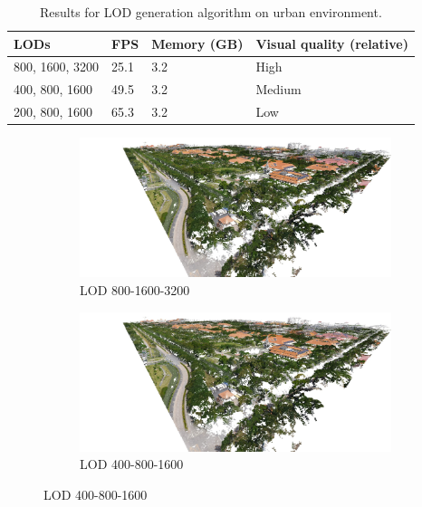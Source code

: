 \begin{table}[h]
    \centering
    \begin{tabular}{l|l|l|l}
    LODs & FPS & Memory (GB) & Visual quality (relative) \\ \hline
    800, 1600, 3200 & 25.1 & 3.2 & High \\
    400, 800, 1600 & 49.5 & 3.2 & Medium \\
    200, 800, 1600 & 65.3 & 3.2 & Low
    \end{tabular}
    
    \caption{Results for LOD generation algorithm on urban environment.}
    \label{tab:results:lod-urban}
\end{table}

\begin{figure}[htb]
    \centering
    
    \begin{subfigure}{0.45\textwidth}
        \centering
        \includegraphics[width=\textwidth]{lod-urban-800.jpg}
        \caption{LOD 800-1600-3200}
        \label{fig:results:lod-urban-800}
    \end{subfigure}
    \begin{subfigure}{0.45\textwidth}
        \centering
        \includegraphics[width=\textwidth]{lod-urban-400.jpg}
        \caption{LOD 400-800-1600}
        \label{fig:results:lod-urban-400}
    \end{subfigure}
    

\end{figure}
